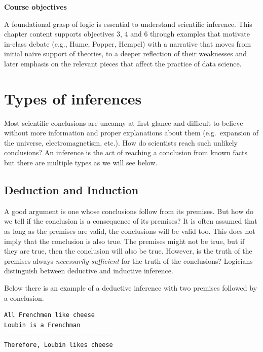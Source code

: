 \documentclass[
  12pt,
]{book}
\begin{document}
\begin{simplebox}

\textbf{Course objectives}

A foundational grasp of logic is essential to understand scientific inference. This chapter content supports objectives 3, 4 and 6 through examples that motivate in-class debate (e.g., Hume, Popper, Hempel) with a narrative that moves from initial naïve support of theories, to a deeper reflection of their weaknesses and later emphasis on the relevant pieces that affect the practice of data science.

\end{simplebox}

\section{Types of inferences}\label{types-of-inferences}

Most scientific conclusions are uncanny at first glance and difficult to believe without more information and proper explanations about them (e.g.~expansion of the universe, electromagnetism, etc.). How do scientists reach such unlikely conclusions? An inference is the act of reaching a conclusion from known facts but there are multiple types as we will see below.

\subsection{Deduction and Induction}\label{deduction}

A good argument is one whose conclusions follow from its premises. But how do we tell if the conclusion is a consequence of its premises? It is often assumed that as long as the premises are valid, the conclusions will be valid too. This does not imply that the conclusion is also true. The premises might not be true, but if they are true, then the conclusion will also be true. However, is the truth of the premises always \emph{necessarily sufficient} for the truth of the conclusions? Logicians distinguish between deductive and inductive inference. \citep{sep-abduction}

Below there is an example of a deductive inference with two premises followed by a conclusion.

\begin{verbatim}
All Frenchmen like cheese
Loubin is a Frenchman
------------------------------
Therefore, Loubin likes cheese
\end{verbatim}
\end{document}
